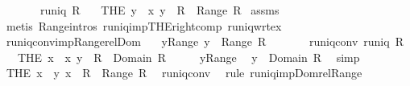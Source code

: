 \begin{isabellebody}
\ \ \ \ \ \ \ {\isachardoublequoteopen}runiq\ R{\isachardoublequoteclose}\isanewline
\ \ \ {\isachardoublequoteopen}{\isacharparenleft}THE\ y\ {\isachardot}\ {\isacharparenleft}x{\isacharcomma}\ y{\isacharparenright}\ {\isasymin}\ R{\isacharparenright}\ {\isasymin}\ Range\ R{\isachardoublequoteclose}\isanewline
%
\isadelimproof
%
\endisadelimproof
%
\isatagproof
{}\isamarkupfalse%
\ assms\isanewline
{}\isamarkupfalse%
\ {\isacharparenleft}metis\ Range{\isachardot}intros\ runiq{\isacharunderscore}imp{\isacharunderscore}THE{\isacharunderscore}right{\isacharunderscore}comp\ runiq{\isacharunderscore}wrt{\isacharunderscore}ex{}{\isacharparenright}%
\endisatagproof
{\isafoldproof}%
%
\isadelimproof
\isanewline
%
\endisadelimproof
\isanewline
{}\isamarkupfalse%
\ runiq{\isacharunderscore}conv{\isacharunderscore}imp{\isacharunderscore}Range{\isacharunderscore}rel{\isacharunderscore}Dom{\isacharcolon}\isanewline
\ \ \ y{\isacharunderscore}Range{\isacharcolon}\ {\isachardoublequoteopen}y\ {\isasymin}\ Range\ R{\isachardoublequoteclose}\isanewline
\ \ \ \ \ \ \ runiq{\isacharunderscore}conv{\isacharcolon}\ {\isachardoublequoteopen}runiq\ {\isacharparenleft}R{\isasyminverse}{\isacharparenright}{\isachardoublequoteclose}\isanewline
\ \ \ {\isachardoublequoteopen}{\isacharparenleft}THE\ x\ {\isachardot}\ {\isacharparenleft}x{\isacharcomma}\ y{\isacharparenright}\ {\isasymin}\ R{\isacharparenright}\ {\isasymin}\ Domain\ R{\isachardoublequoteclose}\isanewline
%
\isadelimproof
%
\endisadelimproof
%
\isatagproof
{}\isamarkupfalse%
\ {\isacharminus}\isanewline
\ \ \isamarkupfalse%
\ y{\isacharunderscore}Range\ \isamarkupfalse%
\ {\isachardoublequoteopen}y\ {\isasymin}\ Domain\ {\isacharparenleft}R{\isasyminverse}{\isacharparenright}{\isachardoublequoteclose}\ \isamarkupfalse%
\ simp\isanewline
\ \ \isamarkupfalse%
\ \isamarkupfalse%
\ {\isachardoublequoteopen}{\isacharparenleft}THE\ x\ {\isachardot}\ {\isacharparenleft}y{\isacharcomma}\ x{\isacharparenright}\ {\isasymin}\ R{\isasyminverse}{\isacharparenright}\ {\isasymin}\ Range\ {\isacharparenleft}R{\isasyminverse}{\isacharparenright}{\isachardoublequoteclose}\ \isamarkupfalse%
\ runiq{\isacharunderscore}conv\ \isamarkupfalse%
\ {\isacharparenleft}rule\ runiq{\isacharunderscore}imp{\isacharunderscore}Dom{\isacharunderscore}rel{\isacharunderscore}Range{\isacharparenright}\isanewline

\end{isabellebody}
